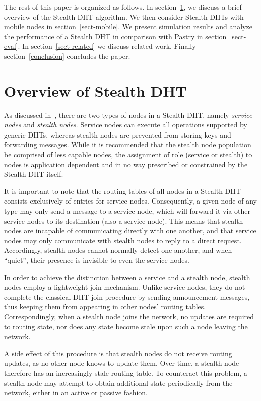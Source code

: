 \documentclass[conference]{IEEEtran}
\begin{document}
The rest of this paper is organized as follows. In
section~\ref{sect-overview}, we discuss a brief overview of the
Stealth DHT algorithm. We then consider Stealth DHTs with mobile
nodes in section~\ref{sect-mobile}. We present simulation results
and analyze the performance of a Stealth DHT in comparison with
Pastry in section~\ref{sect-eval}. In section~\ref{sect-related} we
discuss related work. Finally section~\ref{conclusion} concludes the
paper.

\section{Overview of Stealth DHT}
\label{sect-overview}

As discussed in~\cite{stealth1}, there are two types of nodes in a
Stealth DHT, namely {\em service nodes} and {\em stealth nodes}.
Service nodes can execute all operations supported by generic DHTs,
whereas stealth nodes are prevented from storing keys and forwarding
messages. While it is recommended that the stealth node population
be comprised of less capable nodes, the assignment of role (service
or stealth) to nodes is application dependent and in no way
prescribed or constrained by the Stealth DHT itself.

It is important to note that the routing tables of all nodes in a
Stealth DHT consists exclusively of entries for service nodes.
Consequently, a given node of any type may only send a message to a
service node, which will forward it via other service nodes to its
destination (also a service node). This means that stealth nodes are
incapable of communicating directly with one another, and that
service nodes may only communicate with stealth nodes to reply to a
direct request. Accordingly, stealth nodes cannot normally detect
one another, and when ``quiet'', their presence is invisible to even
the service nodes.

In order to achieve the distinction between a service and a stealth
node, stealth nodes employ a lightweight join mechanism. Unlike
service nodes, they do not complete the classical DHT join procedure
by sending announcement messages, thus keeping them from appearing
in other nodes' routing tables. Correspondingly, when a stealth node
joins the network, no updates are required to routing state, nor
does any state become stale upon such a node leaving the network.

A side effect of this procedure is that stealth nodes do not receive
routing updates, as no other node knows to update them. Over time, a
stealth node therefore has an increasingly stale routing table. To
counteract this problem, a stealth node may attempt to obtain
additional state periodically from the network, either in an active
or passive fashion.
\end{document}
